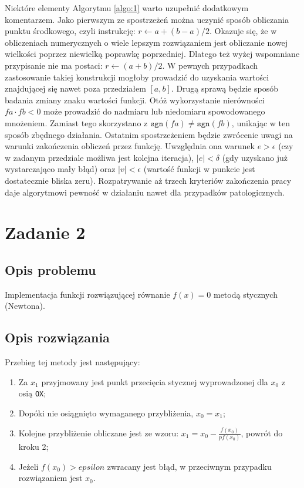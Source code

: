 \documentclass{classrep}
\begin{document}
		Niektóre elementy Algorytmu \ref{algo:1} warto uzupełnić dodatkowym komentarzem. Jako pierwszym ze spostrzeżeń można uczynić sposób obliczania punktu środkowego, czyli instrukcję: $r \leftarrow a+(b-a)/2$. Okazuje się, że w obliczeniach numerycznych o wiele lepszym rozwiązaniem jest obliczanie nowej wielkości poprzez niewielką poprawkę poprzedniej. Dlatego też wyżej wspomniane przypisanie nie ma postaci: $r \leftarrow (a+b)/2$. W pewnych przypadkach zastosowanie takiej konstrukcji mogłoby prowadzić do uzyskania wartości znajdującej się nawet poza przedziałem $[a,b]$.
		Drugą sprawą będzie sposób badania zmiany znaku wartości funkcji. Otóż wykorzystanie nierówności $fa\cdot fb < 0$ może prowadzić do nadmiaru lub niedomiaru spowodowanego mnożeniem. Zamiast tego skorzystano z $\texttt{sgn}(fa) \neq \texttt{sgn}(fb)$, unikając w ten sposób zbędnego działania.
		Ostatnim spostrzeżeniem będzie zwrócenie uwagi na warunki zakończenia obliczeń przez funkcję. Uwzględnia ona warunek $e > \epsilon$ (czy w zadanym przedziale możliwa jest kolejna iteracja), $|e| < \delta$ (gdy uzyskano już wystarczająco mały błąd) oraz $|v| < \epsilon$ (wartość funkcji w punkcie jest dostatecznie bliska zeru). Rozpatrywanie aż trzech kryteriów zakończenia pracy daje algorytmowi pewność w działaniu nawet dla przypadków patologicznych.
	
\section{Zadanie 2}
	\subsection{Opis problemu}
		Implementacja funkcji rozwiązującej równanie $f(x)=0$ metodą stycznych (Newtona).
		
	\subsection{Opis rozwiązania}	
		Przebieg tej metody jest następujący:
		\begin{enumerate}
			\item Za $x_1$ przyjmowany jest punkt przecięcia stycznej wyprowadzonej dla $x_0$ z osią \texttt{OX};
			\item Dopóki nie osiągnięto wymaganego przybliżenia, $x_0 = x_1$;
			\item Kolejne przybliżenie obliczane jest ze wzoru: $x_1 = x_0-\frac{f(x_0)}{pf(x_0)}$, powrót do kroku 2;
			\item Jeżeli $f(x_0)>epsilon$ zwracany jest błąd, w przeciwnym przypadku rozwiązaniem jest $x_0$.
		\end{enumerate}	
	
\end{document}
